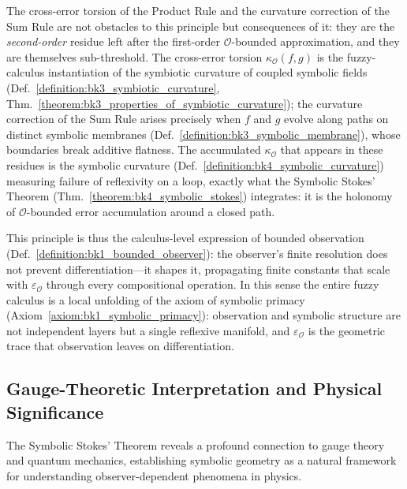 \begin{scholium}
The cross-error torsion of the Product Rule and the curvature correction of the Sum
Rule are not obstacles to this principle but consequences of it: they are the
\emph{second-order} residue left after the first-order $\mathcal{O}$-bounded
approximation, and they are themselves sub-threshold. The cross-error torsion
$\kappa_{\mathcal{O}}(f,g)$ is the fuzzy-calculus instantiation of the symbiotic
curvature of coupled symbolic fields
(Def.~\ref{definition:bk3_symbiotic_curvature},
Thm.~\ref{theorem:bk3_properties_of_symbiotic_curvature}); the curvature correction
of the Sum Rule arises precisely when $f$ and $g$ evolve along paths on distinct
symbolic membranes (Def.~\ref{definition:bk3_symbolic_membrane}), whose boundaries
break additive flatness. The accumulated $\kappa_{\mathcal{O}}$ that appears in these
residues is the symbolic curvature (Def.~\ref{definition:bk4_symbolic_curvature})
measuring failure of reflexivity on a loop, exactly what the Symbolic Stokes' Theorem
(Thm.~\ref{theorem:bk4_symbolic_stokes}) integrates: it is the holonomy of
$\mathcal{O}$-bounded error accumulation around a closed path.

This principle is thus the calculus-level expression of bounded observation
(Def.~\ref{definition:bk1_bounded_observer}): the observer's finite resolution
does not prevent differentiation---it shapes it, propagating finite constants that
scale with $\varepsilon_{\mathcal{O}}$ through every compositional operation. In
this sense the entire fuzzy calculus is a local unfolding of the axiom of symbolic
primacy (Axiom~\ref{axiom:bk1_symbolic_primacy}): observation and symbolic structure
are not independent layers but a single reflexive manifold, and $\varepsilon_{\mathcal{O}}$
is the geometric trace that observation leaves on differentiation.
\end{scholium}

\subsection{Gauge-Theoretic Interpretation and Physical Significance}
\label{subsec:bk4_guage_theoretic_iterpretation_and_physical_significance}

The Symbolic Stokes' Theorem reveals a profound connection to gauge theory and quantum mechanics, establishing symbolic geometry as a natural framework for understanding observer-dependent phenomena in physics.

